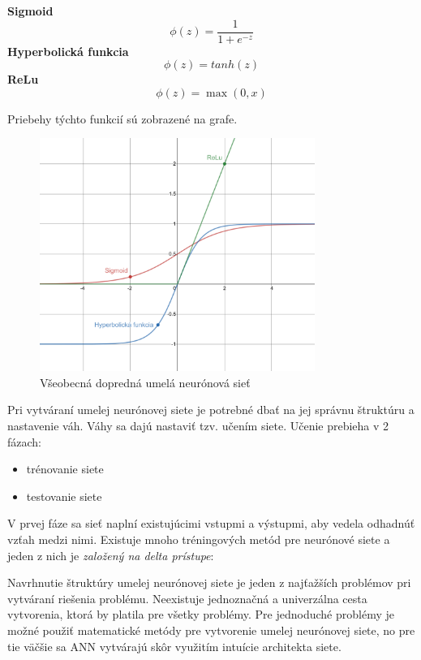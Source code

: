 \textbf{Sigmoid}
\begin{equation}
    \phi(z) = \frac{1}{1+e^{-z}}
\end{equation}
\textbf{Hyperbolická funkcia}
\begin{equation}
    \phi(z) = tanh(z)
\end{equation}
\textbf{ReLu}
\begin{equation}
    \phi(z) = \max(0, x)
\end{equation}

Priebehy týchto funkcií sú zobrazené na grafe.
\begin{figure}[H]
    \centering
    \includegraphics[width=0.8\textwidth]{images/activation-functions.png}
    \caption{Všeobecná dopredná umelá neurónová sieť}
\end{figure}\label{figure:activation-functions}

Pri vytváraní umelej neurónovej siete je potrebné dbať na jej správnu štruktúru a nastavenie váh.
Váhy sa dajú nastaviť tzv. učením siete.
Učenie prebieha v 2 fázach:
\begin{itemize}
    \item trénovanie siete
    \item testovanie siete
\end{itemize}
V prvej fáze sa sieť naplní existujúcimi vstupmi a výstupmi, aby vedela odhadnúť vzťah medzi nimi.
Existuje mnoho tréningových metód pre neurónové siete a jeden z nich je \emph{založený na delta prístupe}:



Navrhnutie štruktúry umelej neurónovej siete je jeden z najťažších problémov pri vytváraní riešenia problému.
Neexistuje jednoznačná a univerzálna cesta vytvorenia, ktorá by platila pre všetky problémy.
Pre jednoduché problémy je možné použiť matematické metódy pre vytvorenie umelej neurónovej siete, no pre tie väčšie
sa ANN vytvárajú skôr využitím intuície architekta siete.

